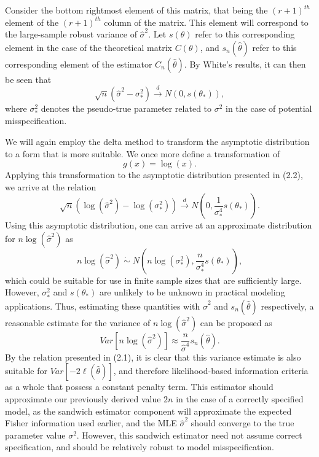 \documentclass[submit]{smj}
\begin{document}
		Consider the bottom rightmost element of this matrix, that being the $(r+1)^{th}$ element of the $(r+1)^{th}$ column of the matrix. This element will correspond to the large-sample
		robust variance of $\hat{\sigma}^2$. Let $s(\theta)$ refer to this corresponding element in the case of the theoretical matrix $C(\theta)$, and $s_n(\hat{\theta})$ refer to this
		corresponding element of the estimator $C_n(\hat{\theta})$. By White's results, it can then be seen that
		\begin{equation}
			\sqrt{n} (\hat{\sigma}^2 - \sigma_*^2) \xrightarrow[]{d} N(0, s(\theta_*)) ,
		\end{equation}
		where $\sigma_*^2$ denotes the pseudo-true parameter related to $\sigma^2$ in the case of potential misspecification.

		We will again employ the delta method to transform the asymptotic distribution to a form that is more suitable. We once more define a transformation of
		\begin{equation*}
			g(x) = \log(x) .
		\end{equation*}
		Applying this transformation to the asymptotic distribution presented in (2.2), we arrive at the relation
		\begin{equation*}
			\sqrt{n} ( \log (\hat{\sigma}^2) - \log(\sigma_*^2)) \xrightarrow[]{d} N \left( 0, \frac{1}{\sigma_*^4} s(\theta_*) \right) .
		\end{equation*}
		Using this asymptotic distribution, one can arrive at an approximate distribution for $n\log(\hat{\sigma}^2)$ as
		\begin{equation*}
			n\log(\hat{\sigma}^2) \; \dot\sim \; N \left( n\log(\sigma_* ^2), \frac{n}{\sigma_*^4} s(\theta_*) \right) ,
		\end{equation*}
		which could be suitable for use in finite sample sizes that are sufficiently large. However, $\sigma_*^2$ and $s(\theta_*)$ are unlikely to be unknown in practical modeling
		applications. Thus, estimating these quantities with $\hat{\sigma}^2$ and $s_n(\hat{\theta})$ respectively, a reasonable estimate for the variance of $n\log(\hat{\sigma}^2)$ can
		be proposed as
		\begin{equation*}
			Var \left[ n\log(\hat{\sigma}^2) \right] \approx \frac{n}{\hat{\sigma}^4} s_n(\hat{\theta}) .
		\end{equation*}
		By the relation presented in (2.1), it is clear that this variance estimate is also suitable for $Var \left[ -2 \ell (\hat{\theta}  ) \right]$, and therefore
		likelihood-based information criteria as a whole that possess a constant penalty term. This estimator should approximate our previously derived value $2n$ in the case of a correctly
		specified model, as the sandwich estimator component will approximate the expected Fisher information used earlier, and the MLE $\hat{\sigma}^2$ should converge to the true
		parameter value $\sigma^2$. However, this sandwich estimator need not assume correct specification, and should be relatively robust to model misspecification.
		
\end{document}
